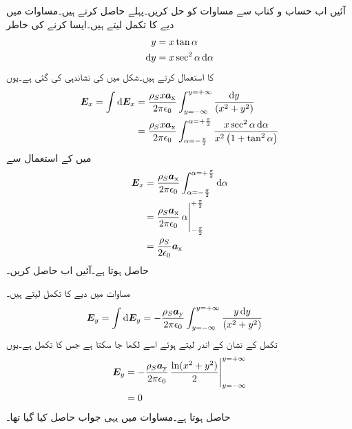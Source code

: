 آئیں اب حساب و کتاب سے مساوات  کو حل کریں۔پہلے  حاصل کرتے ہیں۔مساوات  میں دیے  کا تکمل لیتے ہیں۔ایسا کرنے کی خاطر
\begin{gather}
\begin{aligned}\label{مساوات_کولمب_مماس_کی_مدد_سے_تکملہ_کا_حصول}
y&=x \tan \alpha\\
\dif y &=x \sec^2 \alpha \dif \alpha
\end{aligned}
\end{gather}
کا استعمال کرتے ہیں۔شکل  میں  کی نشاندہی کی گئی ہے۔یوں
\begin{align*}
\kvec{E}_x=\int \dif \kvec{E}_x &=\frac{\rho_S x \ax}{2\pi \epsilon_0}\int_{y=-\infty}^{y=+\infty}\frac{\dif y }{ \left(x^2+y^2\right)}\\
&=\frac{\rho_S x \ax}{2\pi \epsilon_0}\int_{\alpha=-\frac{\pi}{2}}^{\alpha=+\frac{\pi}{2}} \frac{x \sec^2 \alpha \dif \alpha}{x^2\left(1+ \tan^2 \alpha\right)}
\end{align*}
میں  کے استعمال سے
\begin{gather}
\begin{aligned}\label{مساوات_کولمب_لامحدود_سطح_عمودی_جزو}
\kvec{E}_x&=\frac{\rho_S\ax}{2\pi \epsilon_0}\int_{\alpha=-\frac{\pi}{2}}^{\alpha=+\frac{\pi}{2}}\dif \alpha\\
&=\frac{\rho_S\ax}{2\pi \epsilon_0} \eval{\alpha}_{-\frac{\pi}{2}}^{+\frac{\pi}{2}}\\
&=\frac{\rho_S}{2 \epsilon_0}\ax
\end{aligned}
\end{gather}
حاصل ہوتا ہے۔آئیں اب  حاصل کریں۔

مساوات  میں دیے  کا تکمل لیتے ہیں۔
\begin{align*}
\kvec{E}_y=\int \dif \kvec{E}_y&=-\frac{\rho_S \ay}{2 \pi \epsilon_0} \int_{y=-\infty}^{y=+\infty}\frac{ y\dif y }{ \left(x^2+y^2\right)}
\end{align*}
تکمل کے نشان کے اندر  لیتے ہوئے  اسے  لکھا جا سکتا ہے جس کا تکمل  ہے۔یوں
\begin{gather}
\begin{aligned}\label{مساوات_کولمب_لامحدود_سطح_افقی_جزو}
\kvec{E}_y&=-\frac{\rho_S \ay}{2 \pi \epsilon_0} \eval{\frac{\ln(x^2+y^2)}{2}}_{y=-\infty}^{y=+\infty}\\
&=0
\end{aligned}
\end{gather}
حاصل ہوتا ہے۔مساوات  میں یہی جواب حاصل کیا گیا تھا۔

